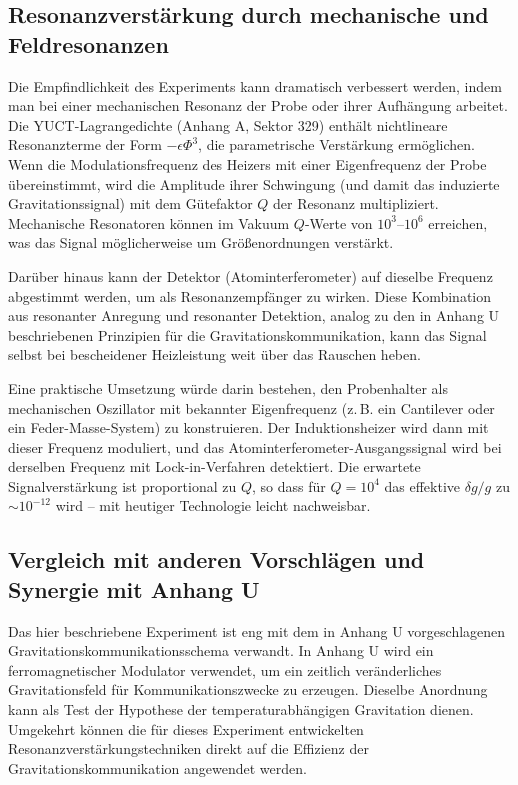 \documentclass[12pt]{article}
\theoremstyle{remark}
\begin{document}
	\subsection{Resonanzverstärkung durch mechanische und Feldresonanzen}
	\label{subsec:resonant-enhancement}
	
	Die Empfindlichkeit des Experiments kann dramatisch verbessert werden, indem man bei einer mechanischen Resonanz der Probe oder ihrer Aufhängung arbeitet. Die YUCT-Lagrangedichte (Anhang A, Sektor 329) enthält nichtlineare Resonanzterme der Form \(-\epsilon \Phi^3\), die parametrische Verstärkung ermöglichen. Wenn die Modulationsfrequenz des Heizers mit einer Eigenfrequenz der Probe übereinstimmt, wird die Amplitude ihrer Schwingung (und damit das induzierte Gravitationssignal) mit dem Gütefaktor \(Q\) der Resonanz multipliziert. Mechanische Resonatoren können im Vakuum \(Q\)-Werte von \(10^3\)–\(10^6\) erreichen, was das Signal möglicherweise um Größenordnungen verstärkt.
	
	Darüber hinaus kann der Detektor (Atominterferometer) auf dieselbe Frequenz abgestimmt werden, um als Resonanzempfänger zu wirken. Diese Kombination aus resonanter Anregung und resonanter Detektion, analog zu den in Anhang U beschriebenen Prinzipien für die Gravitationskommunikation, kann das Signal selbst bei bescheidener Heizleistung weit über das Rauschen heben.
	
	Eine praktische Umsetzung würde darin bestehen, den Probenhalter als mechanischen Oszillator mit bekannter Eigenfrequenz (z. B. ein Cantilever oder ein Feder-Masse-System) zu konstruieren. Der Induktionsheizer wird dann mit dieser Frequenz moduliert, und das Atominterferometer-Ausgangssignal wird bei derselben Frequenz mit Lock-in-Verfahren detektiert. Die erwartete Signalverstärkung ist proportional zu \(Q\), so dass für \(Q = 10^4\) das effektive \(\delta g/g\) zu \(\sim 10^{-12}\) wird – mit heutiger Technologie leicht nachweisbar.
	
	\subsection{Vergleich mit anderen Vorschlägen und Synergie mit Anhang U}
	\label{subsec:comparison-appU}
	
	Das hier beschriebene Experiment ist eng mit dem in Anhang U vorgeschlagenen Gravitationskommunikationsschema verwandt. In Anhang U wird ein ferromagnetischer Modulator verwendet, um ein zeitlich veränderliches Gravitationsfeld für Kommunikationszwecke zu erzeugen. Dieselbe Anordnung kann als Test der Hypothese der temperaturabhängigen Gravitation dienen. Umgekehrt können die für dieses Experiment entwickelten Resonanzverstärkungstechniken direkt auf die Effizienz der Gravitationskommunikation angewendet werden.
	
\end{document}
